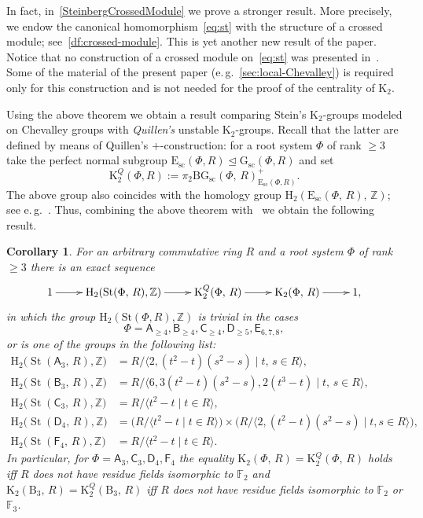 \documentclass[oneside, 11pt]{amsart}
\numberwithin{equation}{section}
\newtheorem*{corollary*}{Corollary}
\theoremstyle{definition}
\theoremstyle{remark}
\DeclareMathOperator\St{St}
\newcommand{\ZZ}{\mathbb{Z}}
\newcommand{\rA}{\mathsf{A}}
\newcommand{\rB}{\mathsf{B}}
\newcommand{\rC}{\mathsf{C}}
\newcommand{\rD}{\mathsf{D}}
\newcommand{\rE}{\mathsf{E}}
\newcommand{\rF}{\mathsf{F}}
\begin{document}
In fact, in~\cref{SteinbergCrossedModule} we prove a stronger result. More precisely, we endow the canonical homomorphism~\eqref{eq:st} with the structure of a crossed module; see~\cref{df:crossed-module}. This is yet another new result of the paper. Notice that no construction of a crossed module on~\eqref{eq:st} was presented in~\cite{Lav, Sin, LavSin}. Some of the material of the present paper (e.\,g.~\cref{sec:local-Chevalley}) is required only for this construction and is not needed for the proof of the centrality of $\mathrm K_2$.

Using the above theorem we obtain a result comparing Stein's $\mathrm{K}_2$-groups modeled on Chevalley groups with {\it Quillen's} unstable $\mathrm{K}_2$-groups.
Recall that the latter are defined by means of Quillen's $+$-construction: for a root system $\Phi$ of
rank $\geq3$ take the perfect normal subgroup $\mathrm{E}_{\mathrm{sc}}(\Phi, R) \trianglelefteq \mathrm{G}_{\mathrm{sc}}(\Phi, R)$ and set \[ \mathrm{K}_2^Q(\Phi, R) := \pi_2\mathrm{BG}_{\mathrm{sc}}(\Phi,\,R)^+_{\mathrm{E}_{\mathrm{sc}}(\Phi, R)}.\] The above group also coincides with the homology group $\mathrm H_2(\mathrm E_{\mathrm{sc}}(\Phi,\,R),\,\mathbb Z)$; see e.\,g.~\cite[\S~IV.1]{Weibel}.
Thus, combining the above theorem with~\cite{St71,vdKStein} we obtain the following result.
\begin{corollary*}
For an arbitrary commutative ring $R$ and a root system $\Phi$ of rank $\geq 3$ there is an exact sequence \[ \xymatrix{ 1\ar@{->}[r]&{\mathrm H_2(\St(\Phi,\,R),\ZZ)}\ar@{->}[r]&\mathrm K_2^Q(\Phi,\,R)\ar@{->}[r]&\mathrm K_2(\Phi,\,R)\ar@{->}[r]&1,}\] in which the group $\mathrm H_2(\mathrm{St}(\Phi, R), \ZZ)$ is trivial in the cases 
\[\Phi= \rA_{\geq 4},\rB_{\geq 4},\rC_{\geq 4}, \rD_{\geq 5}, \rE_{6,7,8},\] or is one of the groups in the following list:
\begin{align*}
\mathrm H_2\big(\St(\rA_3,\,R),\ZZ\big)&=R/\langle2, (t^2-t)(s^2-s)\mid t,\,s\in R\rangle,\\
\mathrm H_2\big(\St(\rB_3,\,R),\ZZ\big)&=R/\langle6, 3(t^2-t)(s^2-s), 2(t^3-t)\mid t,\,s\in R\rangle,\\
\mathrm H_2\big(\St(\rC_3,\,R),\ZZ\big)&=R/\langle t^2-t\mid t\in R\rangle,\\
\mathrm H_2\big(\St(\rD_4,\,R),\ZZ\big)&=\big(R/\langle t^2-t\mid t\in R\rangle\big)\times\big(R/\langle2,(t^2-t)(s^2-s)\mid t,s\in R\rangle\big),\\
\mathrm H_2\big(\St(\rF_4,\,R),\ZZ\big)&=R/\langle t^2-t\mid t\in R\rangle.
\end{align*}
In particular, for $\Phi=\rA_3,\rC_3,\rD_4,\rF_4$ the equality $\mathrm K_2(\Phi,\,R)=\mathrm K_2^Q(\Phi,\,R)$ holds iff $R$ does not have residue fields isomorphic to $\mathbb F_2$ and $\mathrm K_2(\mathrm B_3,\,R)=\mathrm K_2^Q(\mathrm B_3,\,R)$ iff $R$ does not have residue fields isomorphic to $\mathbb F_2$ or $\mathbb F_3$.
\end{corollary*}
\end{document}
